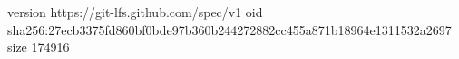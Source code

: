 version https://git-lfs.github.com/spec/v1
oid sha256:27ecb3375fd860bf0bde97b360b244272882cc455a871b18964e1311532a2697
size 174916
